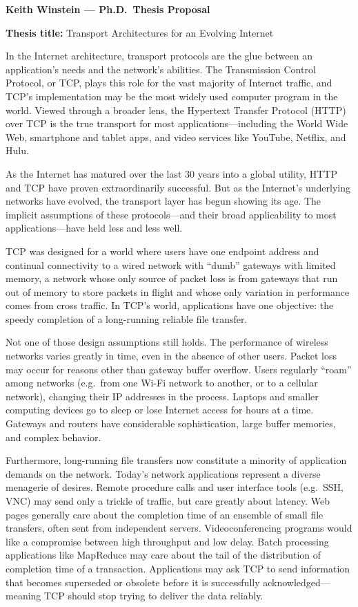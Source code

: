 \documentclass{article}
\begin{document}
\noindent \textbf{Keith Winstein --- Ph.D.~Thesis Proposal}

\vspace{\baselineskip}

\noindent \textbf{Thesis title: } Transport Architectures for an Evolving Internet

\vspace{\baselineskip}

In the Internet architecture, transport protocols are the glue between
an application's needs and the network's abilities. The Transmission
Control Protocol, or TCP, plays this role for the vast majority of
Internet traffic, and TCP's implementation may be the most widely used
computer program in the world. Viewed through a broader lens, the
Hypertext Transfer Protocol (HTTP) over TCP is the true
transport for most applications---including the World Wide Web,
smartphone and tablet apps, and video services like YouTube, Netflix,
and Hulu.

As the Internet has matured over the last 30 years into a global
utility, HTTP and TCP have proven extraordinarily successful. But as
the Internet's underlying networks have evolved, the transport layer
has begun showing its age. The implicit assumptions of these
protocols---and their broad applicability to most applications---have held
less and less well.

TCP was designed for a world where users have one endpoint address and
continual connectivity to a wired network with ``dumb'' gateways with
limited memory, a network whose only source of packet loss is from
gateways that run out of memory to store packets in flight and whose
only variation in performance comes from cross traffic. In TCP's
world, applications have one objective: the speedy completion of a
long-running reliable file transfer.

Not one of those design assumptions still holds. The performance of
wireless networks varies greatly in time, even in the absence of other
users.  Packet loss may occur for reasons other than gateway buffer
overflow. Users regularly ``roam'' among networks (e.g.~from one Wi-Fi
network to another, or to a cellular network), changing their IP
addresses in the process. Laptops and smaller computing devices go to
sleep or lose Internet access for hours at a time.  Gateways and
routers have considerable sophistication, large buffer memories, and
complex behavior.

Furthermore, long-running file transfers now constitute a minority of
application demands on the network. Today's network applications
represent a diverse menagerie of desires. Remote procedure calls and
user interface tools (e.g.~SSH, VNC) may send only a trickle of
traffic, but care greatly about latency. Web pages generally care
about the completion time of an ensemble of small file transfers,
often sent from independent servers. Videoconferencing programs would
like a compromise between high throughput and low delay. Batch
processing applications like MapReduce may care about the tail of the
distribution of completion time of a transaction.  Applications may
ask TCP to send information that becomes superseded or obsolete before
it is successfully acknowledged---meaning TCP should stop trying to
deliver the data reliably.
\end{document}
